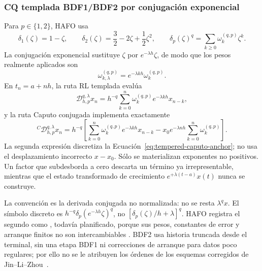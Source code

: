 \subsubsection{CQ templada BDF1/BDF2 por conjugación exponencial}

Para \(p\in\{1,2\}\), HAFO usa
\[
 \delta_1(\zeta)=1-\zeta,
 \qquad
 \delta_2(\zeta)=\frac32-2\zeta+\frac12\zeta^2,
 \qquad
 \delta_p(\zeta)^q=\sum_{k\ge0}\omega_k^{(q,p)}\zeta^k.
\]
La conjugación exponencial sustituye \(\zeta\) por
\(e^{-\lambda h}\zeta\), de modo que los pesos realmente aplicados son
\[
 \omega_{k,\lambda}^{(q,p)}=
 e^{-\lambda kh}\omega_k^{(q,p)}.
\]
En \(t_n=a+nh\), la ruta RL templada evalúa
\begin{equation}
 \mathcal D_{h,p}^{q,\lambda}x_n=
 h^{-q}\sum_{k=0}^{n}
 \omega_k^{(q,p)}e^{-\lambda kh}x_{n-k},
 \label{eq:tempered-cq-rl}
\end{equation}
y la ruta Caputo conjugada implementa exactamente
\begin{equation}
 {}^C\mathcal D_{h,p}^{q,\lambda}x_n=
 h^{-q}\left[
 \sum_{k=0}^{n}\omega_k^{(q,p)}e^{-\lambda kh}x_{n-k}
 -x_0e^{-\lambda nh}\sum_{k=0}^{n}\omega_k^{(q,p)}
 \right].
 \label{eq:tempered-cq-caputo}
\end{equation}
La segunda expresión discretiza la Ecuación~\eqref{eq:tempered-caputo-anchor};
no usa el desplazamiento incorrecto \(x-x_0\). Sólo se materializan
exponentes no positivos. Un factor que subdesborda a cero descarta un término
ya irrepresentable, mientras que el estado transformado de crecimiento
\(e^{+\lambda(t-a)}x(t)\) nunca se construye.

La convención es la derivada conjugada no normalizada: no se resta
\(\lambda^q x\). El símbolo discreto es
\(h^{-q}\delta_p(e^{-\lambda h}\zeta)^q\), no
\([\delta_p(\zeta)/h+\lambda]^q\). HAFO registra el segundo como
, todavía planificado, porque sus pesos,
constantes de error y arranque finitos no son intercambiables
\cite{SabzikarEtAl2015,ChenDeng2015}. BDF2 usa historia truncada desde el
terminal, sin una etapa BDF1 ni correcciones de arranque para datos poco
regulares; por ello no se le atribuyen los órdenes de los esquemas corregidos
de Jin--Li--Zhou~\cite{JinLiZhou2017}.

